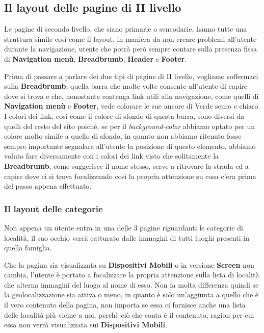 \subsection{Il layout delle pagine di II livello}\label{sec:Pres-IIliv}
Le pagine di secondo livello, che siano primarie o sencodarie, hanno tutte una struttura simile così come il layout, in maniera da non creare problemi all'utente durante la navigazione, utente che potrà però sempre contare sulla presenza fissa di \textbf{Navigation menù}, \textbf{Breadbrumb}, \textbf{Header} e \textbf{Footer}.

Prima di passare a parlare dei due tipi di pagine di II livello, vogliamo soffermaci sulla \textbf{Breadbrumb}, quella barra che molte volte consente all'utente di capire dove si trova e che, nonostante contenga link utili alla navigazione, come quelli di \textbf{Navigation menù} e \textbf{Footer}, vede colorare le sue ancore di Verde scuro e chiaro. I colori dei link, così come il colore di sfondo di questa barra, sono diversi da quelli del resto del sito poichè, se per il \textit{background-color} abbiamo optato per un colore molto simile a quello di sfondo, in quanto non abbiamo ritenuto fosse sempre importante segnalare all'utente la posizione di questo elemento, abbiamo voluto fare diversamente con i colori dei link visto che solitamente la \textbf{Breadbrumb}, come suggerisce il nome stesso, serve a ritrovare la strada ed a capire dove ci si trova focalizzando così la propria attenzione su cosa c'era prima del passo appena effettuato.

\subsubsection{Il layout delle categorie}\label{sec:Pres-IIliv-cat}
Non appena un utente entra in una delle 3 pagine riguardanti le categorie di località, il suo occhio verrà catturato dalle immagini di tutti luoghi presenti in quella famiglia.

Che la pagina sia visualizzata su \textbf{Dispositivi Mobili} o in versione \textbf{Screen} non cambia, l'utente è portato a focalizzare la propria attenzione sulla lista di località che alterna immagini del luogo al nome di esso. Non fa molta differenza quindi se la geolocalizzazione sia attiva o meno, in quanto è solo un'aggiunta a quello che è il vero contenuto della pagina, non importa se essa ci fornisce anche una lista delle località più vicine a noi, perchè ciò che conta è il contenuto, ragion per cui essa non verrà visualizzata sui \textbf{Dispositivi Mobili}.

